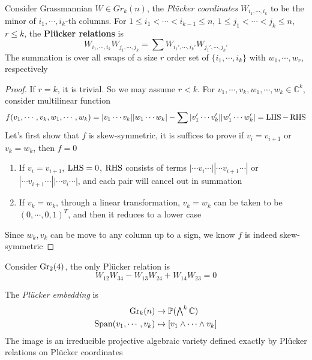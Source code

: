 \documentclass[main]{subfiles}
\begin{document}
\begin{definition}
Consider Grassmannian $W\in Gr_k(n)$, the \textit{Pl\"ucker coordinates} $W_{i_1,\cdots,i_k}$ to be the minor of  $i_1,\cdots,i_k$-th columns. For  $1\leq i_1<\cdots<i_{k-1}\leq n$, $1\leq j_1<\cdots<j_k\leq n$, $r\leq k$, the \textbf{Pl\"ucker relations} is
\[W_{i_1,\cdots,i_k}W_{j_1,\cdots,j_k}=\sum W_{i_1',\cdots,i_k'}W_{j_1',\cdots,j_k'}\]
The summation is over all swaps of a size $r$ order set of $\{i_1,\cdots,i_k\}$ with $w_1,\cdots,w_r$, respectively
\end{definition}

\begin{proof}
If $r=k$, it is trivial. So we may assume $r<k$. For $v_1,\cdots,v_k,w_1,\cdots,w_k\in\mathbb C^k$, consider multilinear function
\[f(v_1,\cdots,v_k,w_1,\cdots,w_k)=|v_1\cdots v_k||w_1\cdots w_k|-\sum|v_1'\cdots v_k'||w_1'\cdots w_k'|=\operatorname{LHS}-\operatorname{RHS}\]
Let's first show that $f$ is skew-symmetric, it is suffices to prove if $v_i=v_{i+1}$ or $v_k=w_k$, then $f=0$
\begin{enumerate}[label=(\roman*)]
\item If $v_i=v_{i+1}$, $\operatorname{LHS}=0$, $\operatorname{RHS}$ consists of terms $|\cdots v_i\cdots||\cdots v_{i+1}\cdots|$ or $|\cdots v_{i+1}\cdots||\cdots v_i\cdots|$, and each pair will cancel out in summation
\item If $v_k=w_k$, through a linear transformation, $v_k=w_k$ can be taken to be $(0,\cdots,0,1)^T$, and then it reduces to a lower case
\end{enumerate}
Since $w_k,v_k$ can be move to any column up to a sign, we know $f$ is indeed skew-symmetric
\end{proof}

\begin{example}
Consider $\operatorname{Gr}_2(4)$, the only Pl\"ucker relation is
\[W_{12}W_{34}-W_{13}W_{24}+W_{14}W_{23}=0\]
\end{example}

\begin{theorem}
The \textit{Pl\"ucker embedding} is
\begin{align*}
\operatorname{Gr}_k(n)&\to \mathbb P(\textstyle\bigwedge^k\mathbb C) \\
\operatorname{Span}(v_1,\cdots,v_k)&\mapsto[v_1\wedge\cdots\wedge v_k]
\end{align*}
The image is an irreducible projective algebraic variety defined exactly by Pl\"ucker relations on Pl\"ucker coordinates
\end{theorem}
\end{document}
